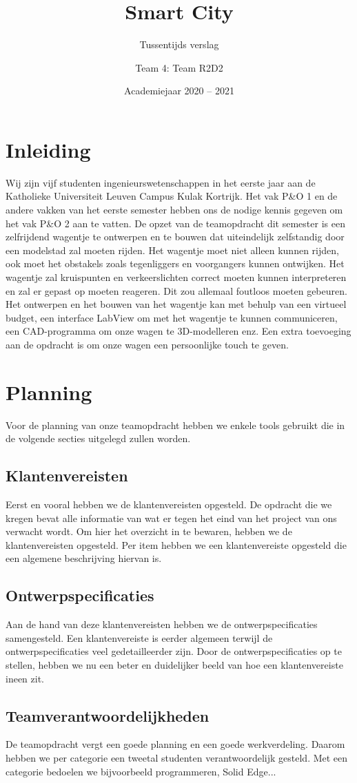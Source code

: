 \documentclass[a4paper,twoside,kulak]{kulakreport}
\title{Smart City}
\subtitle{Tussentijds verslag}
\author{Team 4: Team R2D2}
\institute{Matthijs Deforche, Karl Van Holder, Thomas Varheust, Kobe De Weerdt, Yaron Verhulst}
\date{Academiejaar 2020 -- 2021}
\begin{document}
	\titlepage
	\chapter*{Inleiding}
	Wij zijn vijf studenten ingenieurswetenschappen in het eerste jaar aan de Katholieke Universiteit Leuven Campus Kulak Kortrijk.
	Het vak P\&O 1 en de andere vakken van het eerste semester hebben ons de nodige kennis gegeven om het vak P\&O 2 aan te vatten. 
	De opzet van de teamopdracht dit semester is een zelfrijdend wagentje te ontwerpen en te bouwen dat uiteindelijk zelfstandig door een modelstad zal moeten rijden. Het wagentje moet niet alleen kunnen rijden, ook moet het obstakels zoals tegenliggers en voorgangers kunnen ontwijken. Het wagentje zal kruispunten en verkeerslichten correct moeten kunnen interpreteren en zal er gepast op moeten reageren. Dit zou allemaal foutloos moeten gebeuren. Het ontwerpen en het bouwen van het wagentje kan met behulp van een virtueel budget, een interface LabView om met het wagentje te kunnen communiceren, een CAD-programma om onze wagen te 3D-modelleren enz. 
	Een extra toevoeging aan de opdracht is om onze wagen een persoonlijke touch te geven. 
	
	
	\chapter*{Planning}
	Voor de planning van onze teamopdracht hebben we enkele tools gebruikt die in de volgende secties uitgelegd zullen worden. 
	\section*{Klantenvereisten}
	Eerst en vooral hebben we de klantenvereisten opgesteld. De opdracht die we kregen bevat alle informatie van wat er tegen het eind van het project van ons verwacht wordt. Om hier het overzicht in te bewaren, hebben we de klantenvereisten opgesteld. Per item hebben we een klantenvereiste opgesteld die een algemene beschrijving hiervan is. 
	\section*{Ontwerpspecificaties}Aan de hand van deze klantenvereisten hebben we de ontwerpspecificaties samengesteld. Een klantenvereiste is eerder algemeen terwijl de ontwerpspecificaties veel gedetailleerder zijn. Door de ontwerpspecificaties op te stellen, hebben we nu een beter en duidelijker beeld van hoe een klantenvereiste ineen zit. 
	\section*{Teamverantwoordelijkheden}De teamopdracht vergt een goede planning en een goede werkverdeling. Daarom hebben we per categorie een tweetal studenten verantwoordelijk gesteld. Met een categorie bedoelen we bijvoorbeeld programmeren, Solid Edge...
\end{document}
